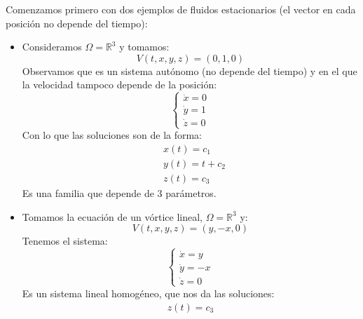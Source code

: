\begin{ejemplo} %
    Comenzamos primero con dos ejemplos de fluidos estacionarios (el vector en cada posición no depende del tiempo):
    \begin{itemize}
        \item Consideramos $\Omega = \mathbb{R}^3$ y tomamos:
            \begin{equation*}
                V(t,x,y,z) = (0,1,0)
            \end{equation*}
            Observamos que es un sistema autónomo (no depende del tiempo) y en el que la velocidad tampoco depende de la posición:
            \begin{equation*}
                \left\{\begin{array}{l}
                        \dot{x} = 0 \\
                        \dot{y} = 1 \\
                        \dot{z} = 0 
                \end{array}\right.
            \end{equation*}
            Con lo que las soluciones son de la forma:
            \begin{align*}
                &x(t) = c_1 \\
                &y(t) = t + c_2 \\
                &z(t) = c_3
            \end{align*}
            Es una familia que depende de 3 parámetros.
        \item Tomamos la ecuación de un vórtice lineal, $\Omega = \mathbb{R}^3$ y:
            \begin{equation*}
                V(t,x,y,z) = (y, -x, 0)
            \end{equation*}
            Tenemos el sistema:
            \begin{equation*}
                \left\{\begin{array}{l}
                        \dot{x} = y \\
                        \dot{y} = -x \\
                        \dot{z} = 0
                \end{array}\right.
            \end{equation*}
            Es un sistema lineal homogéneo, que nos da las soluciones:
            \begin{align*}
                z(t) = c_3
            \end{align*}

\end{itemize}
\end{ejemplo}

